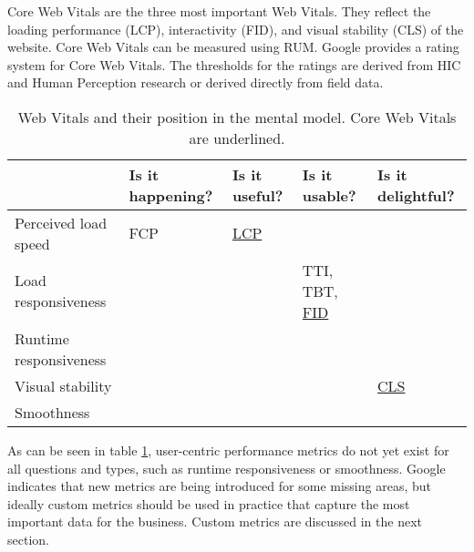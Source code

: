 Core Web Vitals are the three most important Web Vitals.
They reflect the loading performance (LCP), interactivity (FID), and visual stability (CLS) of the website.
Core Web Vitals can be measured using RUM.
Google provides a rating system for Core Web Vitals.
The thresholds for the ratings are derived from HIC and Human Perception research or derived directly from field data.


\begin{table}[h]
	\small
	\centering
	\begin{tabular}{ | l | l | l | l | l |}
	\hline
	\cellcolor{lightgrey} & Is it happening? & Is it useful? & Is it usable? & Is it delightful? \\
	\hline
	Perceived load speed & FCP & \underline{LCP} & & \\
	\hline
	Load responsiveness & & & TTI, TBT, \underline{FID} & \\
	\hline
	Runtime responsiveness & & & & \\
	\hline
	Visual stability & & & & \underline{CLS} \\
	\hline
	Smoothness & & & & \\
	\hline
	\end{tabular}
	\medskip
	\caption{Web Vitals and their position in the mental model. Core Web Vitals are underlined.}
	\label{table:vitals_summary}
\end{table}

As can be seen in table \ref{table:vitals_summary}, user-centric performance metrics do not yet exist for all questions and types, such as runtime responsiveness or smoothness.
Google indicates that new metrics are being introduced for some missing areas, but ideally custom metrics should be used in practice that capture the most important data for the business. %
Custom metrics are discussed in the next section.




